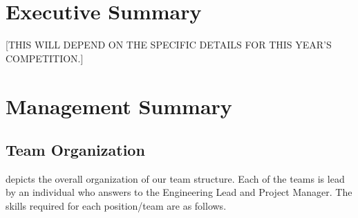 \documentclass[proposal]{byu-aero}
\begin{document}

\section{Executive Summary} %
\label{sec:ExecutiveSummary}

{\color{BYUred}[THIS WILL DEPEND ON THE SPECIFIC DETAILS FOR THIS YEAR'S COMPETITION.]}
\lipsum[1-2]





\section{Management Summary} %
\label{sec:ManagementSummary}



\subsection{Team Organization}
\label{ssec:TeamOrganization}



 depicts the overall organization of our team structure.  Each of the teams is lead by an individual who answers to the Engineering Lead and Project Manager.  The skills required for each position/team are as follows.
\end{document}
